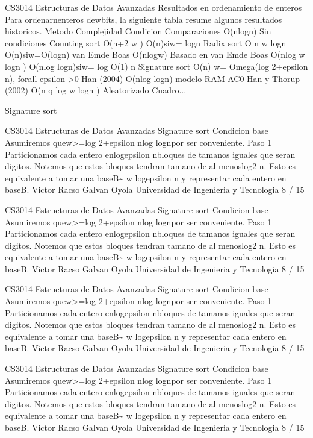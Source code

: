 \begin{description}[leftmargin=!,labelwidth=4.2em,style=nextline]
\item[Pag. 15] CS3014 Estructuras de Datos Avanzadas Resultados en ordenamiento de enteros Para ordenarnenteros dewbits, la siguiente tabla resume algunos resultados historicos. Metodo Complejidad Condicion Comparaciones O(nlogn) Sin condiciones Counting sort O(n+2 w ) O(n)siw= logn Radix sort O n w logn O(n)siw=O(logn) van Emde Boas O(nlogw) Basado en van Emde Boas O(nlog w logn ) O(nlog logn)siw= log O(1) n Signature sort O(n) w= Omega(log 2+epsilon n), forall epsilon >0 Han (2004) O(nlog logn) modelo RAM AC0 Han y Thorup (2002) O(n q log w logn ) Aleatorizado Cuadro...
\item[Pag. 16] Signature sort
\item[Pag. 17] CS3014 Estructuras de Datos Avanzadas Signature sort Condicion base Asumiremos quew>=log 2+epsilon nlog lognpor ser conveniente. Paso 1 Particionamos cada entero enlogepsilon nbloques de tamanos iguales que seran digitos. Notemos que estos bloques tendran tamano de al menoslog2 n. Esto es equivalente a tomar una baseB\textasciitilde{} w logepsilon n y representar cada entero en baseB. Victor Racso Galvan Oyola Universidad de Ingenieria y Tecnologia 8 / 15
\item[Pag. 18] CS3014 Estructuras de Datos Avanzadas Signature sort Condicion base Asumiremos quew>=log 2+epsilon nlog lognpor ser conveniente. Paso 1 Particionamos cada entero enlogepsilon nbloques de tamanos iguales que seran digitos. Notemos que estos bloques tendran tamano de al menoslog2 n. Esto es equivalente a tomar una baseB\textasciitilde{} w logepsilon n y representar cada entero en baseB. Victor Racso Galvan Oyola Universidad de Ingenieria y Tecnologia 8 / 15
\item[Pag. 19] CS3014 Estructuras de Datos Avanzadas Signature sort Condicion base Asumiremos quew>=log 2+epsilon nlog lognpor ser conveniente. Paso 1 Particionamos cada entero enlogepsilon nbloques de tamanos iguales que seran digitos. Notemos que estos bloques tendran tamano de al menoslog2 n. Esto es equivalente a tomar una baseB\textasciitilde{} w logepsilon n y representar cada entero en baseB. Victor Racso Galvan Oyola Universidad de Ingenieria y Tecnologia 8 / 15
\item[Pag. 20] CS3014 Estructuras de Datos Avanzadas Signature sort Condicion base Asumiremos quew>=log 2+epsilon nlog lognpor ser conveniente. Paso 1 Particionamos cada entero enlogepsilon nbloques de tamanos iguales que seran digitos. Notemos que estos bloques tendran tamano de al menoslog2 n. Esto es equivalente a tomar una baseB\textasciitilde{} w logepsilon n y representar cada entero en baseB. Victor Racso Galvan Oyola Universidad de Ingenieria y Tecnologia 8 / 15

\end{description}
